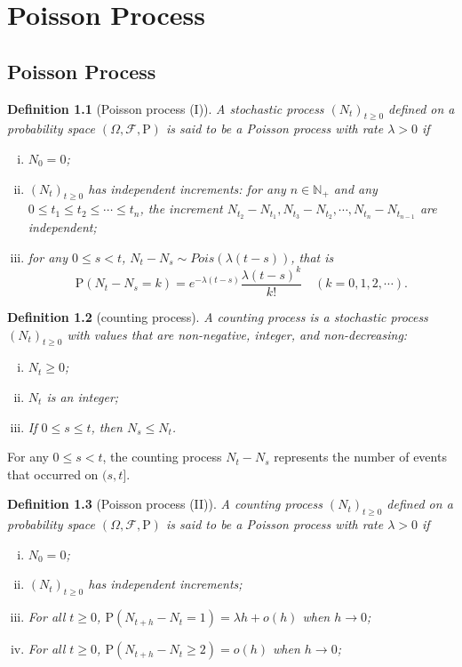\documentclass{report}
\newtheorem{definition}{Definition}[section]
\theoremstyle{nonumberplain}
\begin{document}
\chapter{Poisson Process}
\section{Poisson Process}
\begin{definition}[Poisson process (I)]
	A stochastic process $(N_t)_{t\ge0}$ defined on a probability space $(\Omega,\mathcal{F},\mathrm{P})$ is said to be a \emph{Poisson process} with rate $\lambda>0$ if
	\begin{enumerate}[(i)]
		\item $N_0=0$;
		\item \hypertarget{Definition 2.1(ii)}{} $(N_t)_{t\ge0}$ has independent increments: for any $n\in \mathbb{N}_+$ and any $0\le t_1\le t_2 \le\cdots\le t_n$, the increment $N_{t_2}-N_{t_1},N_{t_3}-N_{t_2},\cdots,N_{t_n}-N_{t_{n-1}}$ are independent;
		\item \hypertarget{Definition 2.1(iii)}{}for any $0\le s < t$, $N_t-N_s\sim Pois(\lambda(t-s))$, that is 
		\[
		\mathrm{P}(N_t-N_s=k)=e^{-\lambda(t-s)}\dfrac{\lambda(t-s)^k}{k!}\quad(k=0,1,2,\cdots).
		\]
	\end{enumerate}	
\end{definition}

\begin{definition}[counting process]
	A \emph{counting process} is a stochastic process $(N_t)_{t\ge 0}$ with values that are non-negative, integer, and non-decreasing:
	\begin{enumerate}[(i)]
		\item $N_t\ge0$;
		\item $N_t$ is an integer;
		\item If $0\le s\le t$, then $N_s \le N_t$.
	\end{enumerate}	
		
\end{definition}
For any $0\le s<t$, the counting process $N_t-N_s$ represents the number of events that occurred on $(s,t]$.  


\begin{definition}[Poisson process (II)]
	A counting process $(N_t)_{t\ge0}$ defined on a probability space $(\Omega,\mathcal{F},\mathrm{P})$ is said to be a \emph{Poisson process} with rate $\lambda>0$ if
	\begin{enumerate}[(i)]
		\item $N_0=0$;
		\item $(N_t)_{t\ge0}$ has independent increments;
		\item \hypertarget{Definition 2.3(iii)}{}For all $t\ge0$, $\mathrm{P}(N_{t+h}-N_t=1)=\lambda h+o(h)$ when $h\to0$;
		\item \hypertarget{Definition 2.3(iv)}{}For all $t\ge0$, $\mathrm{P}(N_{t+h}-N_t\ge2)=o(h)$ when $h\to0$;
	\end{enumerate}	
\end{definition}
\end{document}
